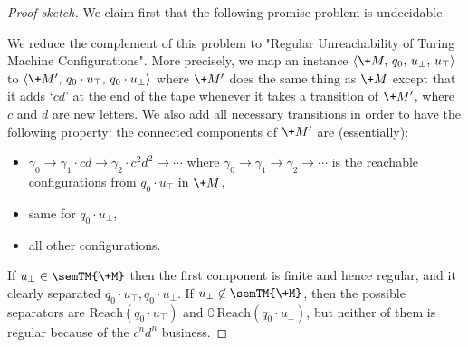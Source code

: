 \begin{proof}[Proof sketch]
  We claim first that the following promise problem is undecidable.

  We reduce the complement of this problem to "Regular Unreachability of Turing Machine Configurations". More precisely, we map an instance
  $\langle \+M,\, q_0,\, u_\bot,\, u_\top \rangle$ to $\langle \+M',\, q_0\cdot u_\top,\, q_0\cdot u_\bot \rangle$ where $\+M'$ does the same thing as $\+M$ except that it adds `$cd$' at the end of the tape
  whenever it takes a transition of $\+M'$, where $c$ and $d$ are new letters.
  We also add all necessary transitions in order to have the following property:
  the connected components of $\+M'$ are (essentially):
  \begin{itemize}
    \item $\gamma_0 \to \gamma_1\cdot cd \to \gamma_2\cdot c^2d^2 \to \cdots$
    where $\gamma_0 \to \gamma_1 \to \gamma_2 \to \cdots$ is the reachable configurations from $q_0\cdot u_\top$ in $\+M$,
    \item same for $q_0\cdot u_\bot$,
    \item all other configurations.
  \end{itemize}
  If $u_\bot \in \semTM{\+M}$ then the first component is finite and hence regular, and it clearly separated $q_0\cdot u_\top, q_0\cdot u_\bot$.
  If $u_\bot \not\in \semTM{\+M}$, then the possible separators are $\textrm{Reach}(q_0\cdot u_\top)$
  and $\complement\,\textrm{Reach}(q_0\cdot u_\bot)$, but neither of them is regular because of the
  $c^nd^n$ business. 
\end{proof}